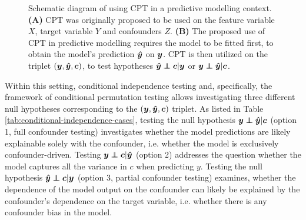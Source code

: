 \documentclass{article}
\begin{document}
\begin{figure}
{

    }
  \caption{Schematic diagram of using CPT in a predictive modelling context. \\ \textbf{(A)} CPT was originally proposed to be used on the feature variable $X$, target variable $Y$ and confounders $Z$. \textbf{(B)} The proposed use of CPT in predictive modelling requires the model to be fitted first, to obtain the model's prediction $\boldsymbol{\hat{y}}$ on $\boldsymbol{y}$. CPT is then utilized on the triplet $(\boldsymbol{y}, \boldsymbol{\hat{y}}, \boldsymbol{c})$, to test hypotheses $\yhat \independent \c | \y$ or $\y \independent \yhat | \c$.}
  \label{fig:schematic}
\end{figure}

Within this setting, conditional independence testing and, specifically, the framework of conditional permutation testing allows investigating three different null hypotheses corresponding to the $(\boldsymbol{y}, \boldsymbol{\hat{y}}, \boldsymbol{c})$ triplet. As listed in Table \ref{tab:conditional-independence-cases}, testing the null hypothesis $\y \independent \yhat | \c$ (option 1, full confounder testing) investigates whether the model predictions are likely explainable solely with the confounder, i.e. whether the model is exclusively confounder-driven. Testing $\y \independent \c | \yhat$ (option 2) addresses the question whether the model captures all the variance in $c$ when predicting $y$. Testing the null hypothesis $\yhat \independent \c | \y$ (option 3, partial confounder testing) examines, whether the dependence of the model output on the confounder can likely be explained by the confounder's dependence on the target variable, i.e. whether there is any confounder bias in the model.
\end{document}
